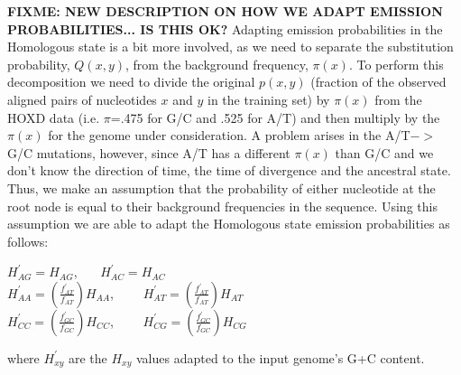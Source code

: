 \documentclass{llncs}
\begin{document}
\textbf{FIXME: NEW DESCRIPTION ON HOW WE ADAPT EMISSION PROBABILITIES... IS THIS OK?}
Adapting emission probabilities in the Homologous state is a bit more
involved, as we need to separate the substitution probability,
$Q(x,y)$, from the background frequency, $\pi(x)$.  To perform this
decomposition we need to divide the original $p(x,y)$ (fraction of the
observed aligned pairs of nucleotides $x$ and $y$ in the training set)
by $\pi(x)$ from the HOXD data (i.e. $\pi$=.475 for G/C and .525 for
A/T) and then multiply by the $\pi(x)$ for the genome under
consideration. A problem arises in the A/T$->$G/C mutations, however,
since A/T has a different $\pi(x)$ than G/C and we don't know the
direction of time, the time of divergence and the ancestral
state. Thus, we make an assumption that the probability of either
nucleotide at the root node is equal to their background frequencies
in the sequence. Using this assumption we are able to adapt the
Homologous state emission probabilities as follows:
\begin{center}
$H^{'}_{AG}=H_{AG}$, \ \ \ $H^{'}_{AC}=H_{AC}$ \\
$H^{'}_{AA}=(\frac{f^{'}_{AT}}{f_{AT}})H_{AA}$, \ \ \ \ 
$H^{'}_{AT}=(\frac{f^{'}_{AT}}{f_{AT}})H_{AT}$\\
$H^{'}_{CC}=(\frac{f^{'}_{GC}}{f_{GC}})H_{CC}$, \ \ \ \ 
$H^{'}_{CG}=(\frac{f^{'}_{GC}}{f_{GC}})H_{CG}$\\
\end{center}
where $H^{'}_{xy}$ are the $H_{xy}$ values adapted to the input genome's G+C content. 

\begin{comment}
Taking  A G pair for example, we have
pi_A * exp{Q(A,G)t} + pi_G*exp{Q(G,A)t}  but since the substitution
process is reversible, Q(A,G)=Q(G,A) and so we're left with
(pi_A+pi_G)*exp{Q(A,G)t}.  So the thing to do here is divide by the
original pi_A+pi_G and multiply by the new pi_A+pi_G.  For the HOXD the
original pi_A+pi_G is 0.525/2 + 0.475/2 = 0.2625+0.2375 = 0.5.  And
indeed, by definition, the new pi_A+pi_G is also 0.5!  So we don't have
to do anything with those values.

I suppose a similar problem arises in the A->T mutations (also T->A, G-
>C, C->G).  for those we're looking at pi_A * exp{Q(A,T)t} + pi_T*exp{Q
(T,A)t}.  which reduces to (pi_A+pi_T)*exp{Q(A,T)t}.  Where pi_A+pi_T =
0.525 in the original HOXD data, and so we will want to compute it for
the new data and adjust emissions accordingly (by dividing old and
multiplying new, pre-gap-normalization.
\end{comment}
\end{document}
